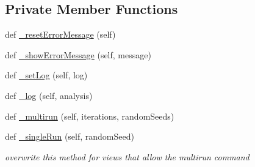 \subsection*{Private Member Functions}
\begin{DoxyCompactItemize}
\item 
def \hyperlink{class_mu_mo_t_1_1_mu_mo_tview_a6822b561e2f9b618639714cd1545772e}{\+\_\+reset\+Error\+Message} (self)
\item 
def \hyperlink{class_mu_mo_t_1_1_mu_mo_tview_a23d2499d6c6334e35bc4cd7de3dd4d3c}{\+\_\+show\+Error\+Message} (self, message)
\item 
def \hyperlink{class_mu_mo_t_1_1_mu_mo_tview_abfc1e19ed53c088799d1f499bc010f7f}{\+\_\+set\+Log} (self, log)
\item 
def \hyperlink{class_mu_mo_t_1_1_mu_mo_tview_a8b4ffd0e4999bd45c6ca33fe0f40d1e3}{\+\_\+log} (self, analysis)
\item 
def \hyperlink{class_mu_mo_t_1_1_mu_mo_tview_a4d4a00545816bf68f912f5ea5a449c48}{\+\_\+multirun} (self, iterations, random\+Seeds)
\item 
def \hyperlink{class_mu_mo_t_1_1_mu_mo_tview_a51d421aacb4cd83af5f1c2e60c3dff9c}{\+\_\+single\+Run} (self, random\+Seed)
\begin{DoxyCompactList}\small\item\em overwrite this method for views that allow the \textquotesingle{}multirun\textquotesingle{} command \end{DoxyCompactList}\end{DoxyCompactItemize}
